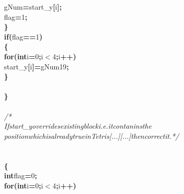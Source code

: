 \documentclass[a4paper, 10pt]{article}
\newcommand\SPC{\hspace*{0.6em}}
\newcommand\HYP{\mbox{\char 45}}
\newcommand{\CppAComment}[1]{\textit{\textcolor[rgb]{0.2,0.6,1}{#1}}}
\newcommand{\CppAIdentifier}[1]{#1}
\newcommand{\CppANumber}[1]{\textcolor[rgb]{0.5,0,0.5}{#1}}
\newcommand{\CppAReservedWord}[1]{\textbf{#1}}
\newcommand{\CppASpace}[1]{\colorbox[rgb]{1,1,1}{#1}}
\newcommand{\CppASymbol}[1]{\textbf{\textcolor[rgb]{1,0,0}{#1}}}
\begin{document}
\begin{ttfamily}
\CppASpace{\SPC \SPC \SPC \SPC \SPC \SPC }\CppAIdentifier{gNum}\CppASymbol{=}\CppAIdentifier{start\_y}\CppASymbol{[}\CppAIdentifier{i}\CppASymbol{]}\CppASymbol{;}\\
\CppASpace{\SPC \SPC \SPC \SPC \SPC }\CppAIdentifier{flag}\CppASymbol{=}\CppANumber{1}\CppASymbol{;}\\
\CppASpace{\SPC \SPC \SPC \SPC }\CppASymbol{\}}\\
\CppASpace{\SPC \SPC \SPC \SPC }\CppAReservedWord{if}\CppASymbol{(}\CppAIdentifier{flag}\CppASymbol{==}\CppANumber{1}\CppASymbol{)}\\
\CppASpace{\SPC \SPC \SPC \SPC }\CppASymbol{\{}\\
\CppASpace{\SPC \SPC \SPC \SPC \SPC }\CppAReservedWord{for}\CppASymbol{(}\CppAReservedWord{int}\CppASpace{\SPC }\CppAIdentifier{i}\CppASymbol{=}\CppANumber{0}\CppASymbol{;}\CppAIdentifier{i}\CppASymbol{$<$}\CppANumber{4}\CppASymbol{;}\CppAIdentifier{i}\CppASymbol{++}\CppASymbol{)}\\
\CppASpace{\SPC \SPC \SPC \SPC \SPC \SPC }\CppAIdentifier{start\_y}\CppASymbol{[}\CppAIdentifier{i}\CppASymbol{]}\CppASymbol{\HYP =}\CppAIdentifier{gNum}\CppASymbol{\HYP }\CppANumber{19}\CppASymbol{;}\\
\CppASpace{\SPC \SPC \SPC \SPC }\CppASymbol{\}}\\
\\
\CppASpace{\SPC \SPC }\CppASymbol{\}}\\
\\
\CppASpace{\SPC \SPC }\CppAComment{/*}\\
\CppAComment{\SPC \SPC \SPC If\SPC start\_y\SPC overrides\SPC existing\SPC block\SPC i.e.\SPC it\SPC contanins\SPC the}\\
\CppAComment{\SPC \SPC \SPC position\SPC which\SPC is\SPC already\SPC true\SPC in\SPC Tetris[...][...]\SPC then\SPC correct\SPC it.\SPC */}\\
\\
\\
\CppASpace{\SPC \SPC }\CppASymbol{\{}\\
\CppASpace{\SPC \SPC \SPC }\CppAReservedWord{int}\CppASpace{\SPC }\CppAIdentifier{flag}\CppASymbol{=}\CppANumber{0}\CppASymbol{;}\\
\CppASpace{\SPC \SPC \SPC }\CppAReservedWord{for}\CppASymbol{(}\CppAReservedWord{int}\CppASpace{\SPC }\CppAIdentifier{i}\CppASymbol{=}\CppANumber{0}\CppASymbol{;}\CppAIdentifier{i}\CppASymbol{$<$}\CppANumber{4}\CppASymbol{;}\CppAIdentifier{i}\CppASymbol{++}\CppASymbol{)}\\

\end{ttfamily}
\end{document}
